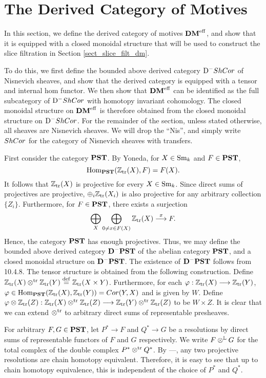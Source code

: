 \newpage
\section{The Derived Category of Motives}\label{sect_dmeff_and_dm}

In this section, we define the derived category of motives $\DMeff$,
and show that it is equipped with a closed monoidal structure that
will be used to construct the slice filtration in Section 
\ref{sect_slice_filt_dm}.

To do this, we first define the bounded above derived category 
$\DShCor$ of Nisnevich sheaves, and show that the derived 
category is equipped with a tensor and internal hom functor. We 
then show that $\DMeff$ can be identified as the full subcategory 
of $\DShCor$ with homotopy invariant cohomology. The closed
monoidal structure on $\DMeff$ is therefore obtained from the
closed monoidal structure on $\DShCor$. For the remainder of the
section, unless stated otherwise, all sheaves are Nisnevich 
sheaves. We will drop the ``Nis'', and simply write $\ShCor$ for 
the category of Nisnevich sheaves with transfers.

First consider the category $\PST$. By Yoneda, for $X \in \Sm$ and
$F \in \PST$,
\[
\hom_{\PST}(\Ztr(X), F) = F(X).
\]
It follows that $\Ztr(X)$ is projective for every $X \in \Sm$.
Since direct sums of projectives are projective, 
$\oplus_i \Ztr(X_i)$ is also projective for any arbitrary 
collection $\{Z_i\}$. Furthermore, for $F \in \PST$, there exists 
a surjection
\begin{equation}\label{eq_res_by_rep}
\bigoplus_{X} \bigoplus_{0 \neq x \in F(X)} \Ztr(X) 
   \stackrel{x}{\to} F.
\end{equation}
Hence, the category $\PST$ has enough projectives. Thus, we may 
define the bounded above derived category $\DCat[D]^-\PST$ of the 
abelian category $\PST$, and a closed monoidal structure on 
$\DCat[D]^-\PST$. The existence of $\DCat[D]^-\PST$ follows from 
\cite{WH} 10.4.8. The tensor structure is obtained from the 
following construction. Define $\Ztr(X) \ttr \Ztr(Y) \defeq 
\Ztr(X \times Y)$. Furthermore, for each $\phi: \Ztr(X) \to 
\Ztr(Y)$, $\phi \in \hom_{\PST}(\Ztr(X), \Ztr(Y)) = \Cor(Y, X)$ 
and is given by $W$. Define $\phi \tensor \Ztr(Z): \Ztr(X) \ttr 
\Ztr(Z) \to \Ztr(Y) \ttr \Ztr(Z)$ to be $W \times Z$. It is clear 
that we can extend $\ttr$ to arbitrary direct sums of 
representable presheaves.

For arbitrary $F, G \in \PST$, let $P^* \to F$ and $Q^* \to G$
be a resolutions by direct sums of representable functors of $F$ 
and $G$ respectively. We write $F \tL G$ for the total complex of 
the double complex $P^* \ttr Q^*$. By \cite{WH} ---, any two 
projective resolutions are chain homotopy equivalent. Therefore, 
it is easy to see that up to chain homotopy equivalence, this is 
independent of the choice of $P^*$ and $Q^*$.

